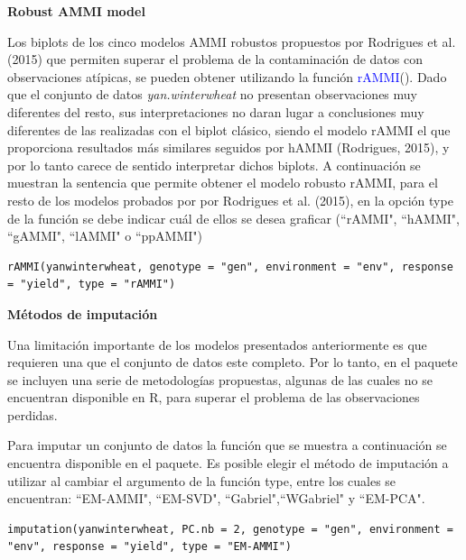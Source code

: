 \textbf{Robust AMMI model}

Los biplots de los cinco modelos AMMI robustos propuestos por Rodrigues et al. (2015) que permiten superar el problema de la contaminación de datos con observaciones atípicas, se pueden obtener utilizando la función \textcolor{blue}{rAMMI}().
Dado que el conjunto de datos \emph{yan.winterwheat} no presentan observaciones muy diferentes del resto, sus interpretaciones no daran lugar a conclusiones muy diferentes de las realizadas con el biplot clásico, siendo el modelo rAMMI el que proporciona resultados más similares seguidos por hAMMI (Rodrigues, 2015), y por lo tanto carece de sentido interpretar dichos biplots.
A continuación se muestran la sentencia que permite obtener el modelo robusto rAMMI, para el resto de los modelos probados por por Rodrigues et al. (2015), en la opción type de la función se debe indicar cuál de ellos se desea graficar (``rAMMI", ``hAMMI", ``gAMMI", ``lAMMI" o ``ppAMMI")


\begin{tcolorbox}[skin=bicolor,
    colframe=aurometalsaurus,colback=backcolour,colbacklower=white,
    width=1\linewidth,
    height=0.1\linewidth,
    boxsep=-3mm]
\begin{lstlisting}
rAMMI(yanwinterwheat, genotype = "gen", environment = "env", response = "yield", type = "rAMMI")
\end{lstlisting}
\end{tcolorbox}



\textbf{Métodos de imputación}

Una limitación importante de los modelos presentados anteriormente es que requieren una que el conjunto de datos este completo. Por lo tanto, en el paquete se incluyen una serie de metodologías propuestas, algunas de las cuales no se encuentran disponible en R, para superar el problema de las observaciones perdidas. 

Para imputar un conjunto de datos la función que se muestra a continuación se encuentra disponible en el paquete. Es posible elegir el método de imputación a utilizar al cambiar el argumento de la función type, entre los cuales se encuentran: ``EM-AMMI", ``EM-SVD", ``Gabriel",``WGabriel" y ``EM-PCA".

\begin{tcolorbox}[skin=bicolor,
    colframe=aurometalsaurus,colback=backcolour,colbacklower=white,
    width=1\linewidth,
    height=0.1\linewidth,
    boxsep=-3mm]
\begin{lstlisting}
imputation(yanwinterwheat, PC.nb = 2, genotype = "gen", environment = "env", response = "yield", type = "EM-AMMI")
\end{lstlisting}
\end{tcolorbox}


